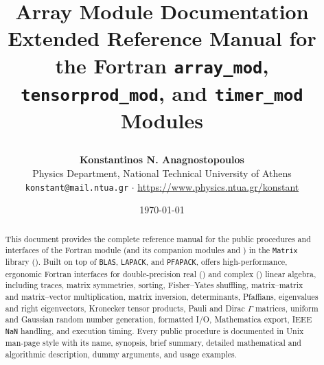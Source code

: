 \documentclass[a4paper,11pt]{article}
\title{%
  \vspace{-1.2cm}%
  \begin{tcolorbox}[
    enhanced,
    colback=modPrimary,
    colframe=modPrimary!80!black,
    coltext=white,
    arc=2mm,
    boxrule=1pt,
    top=12pt, bottom=12pt, left=12pt, right=12pt
  ]
  \centering
  {\LARGE\bfseries Array Module Documentation}\\[6pt]
  {\large Extended Reference Manual for the Fortran \texttt{array\_mod}, \texttt{tensorprod\_mod}, and \texttt{timer\_mod} Modules}
  \end{tcolorbox}%
  \vspace{-0.4cm}%
}
\author{\textbf{Konstantinos N. Anagnostopoulos}\\
  {\small Physics Department, National Technical University of Athens}\\
  {\small \texttt{konstant@mail.ntua.gr} $\cdot$ \url{https://www.physics.ntua.gr/konstant}}}
\date{\small \today}
\begin{document}
\maketitle

\begin{abstract}
\noindent
This document provides the complete reference manual for the public procedures and interfaces of the Fortran  module (and its companion modules  and ) in the \texttt{Matrix} library (). Built on top of \texttt{BLAS}, \texttt{LAPACK}, and \texttt{PFAPACK},  offers high-performance, ergonomic Fortran interfaces for double-precision real () and complex () linear algebra, including traces, matrix symmetries, sorting, Fisher--Yates shuffling, matrix--matrix and matrix--vector multiplication, matrix inversion, determinants, Pfaffians, eigenvalues and right eigenvectors, Kronecker tensor products, Pauli and Dirac $\Gamma$ matrices, uniform and Gaussian random number generation, formatted I/O, Mathematica export, IEEE \texttt{NaN} handling, and execution timing. Every public procedure is documented in Unix man-page style with its name, synopsis, brief summary, detailed mathematical and algorithmic description, dummy arguments, and usage examples.
\end{abstract}

\vspace{0.3cm}
\begin{tcolorbox}[
  enhanced,
  breakable,
  colback=modBoxBg!60,
  colframe=modPrimary!60,
  arc=1.5mm,
  boxrule=0.6pt,
  left=10pt, right=10pt, top=6pt, bottom=8pt
]
\tableofcontents
\end{tcolorbox}
\newpage










\end{document}
